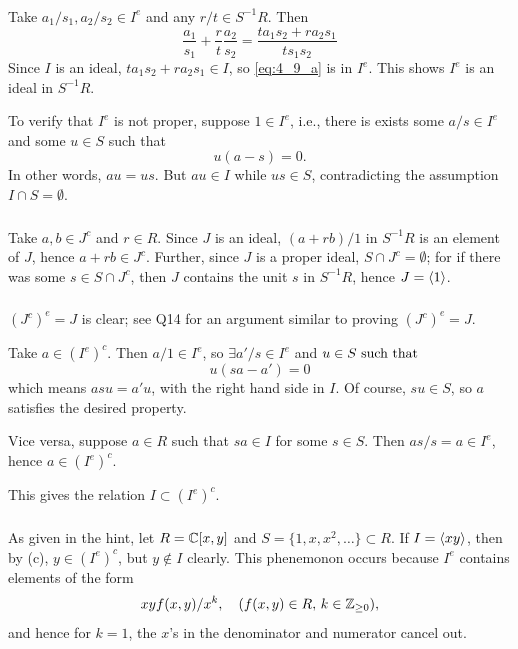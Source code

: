 \documentclass[12pt]{article}
\begin{document}
\subsubsection{} 
Take $a_1 / s_1, a_2 / s_2 \in I^{e}$ and any $r / t \in S^{-1} R$. 
Then 
\begin{equation} \label{eq:4_9_a} 
  \frac{a_1}{s_1} + \frac{r}{t} \frac{a_2}{s_2} = \frac{ta_1 s_2 + ra_2 s_1}{ts_1 s_2}
\end{equation}
Since $I$ is an ideal, $ta_1 s_2 + r a_2 s_1 \in I$, so \eqref{eq:4_9_a} is in $I^{e}$. 
This shows $I^{e}$ is an ideal in $S^{-1}R$. 

To verify that $I^{e}$ is not proper, suppose $1 \in I^{e}$, i.e., 
there is exists some $a / s \in I^{e}$ and some $u \in S$ such that 
$$u(a - s) = 0.$$
In other words, $au = us$. 
But $au \in I$ while $us \in S$, contradicting the assumption $I \cap S = \emptyset$. 

\subsubsection{} 
Take $a, b \in J^{c}$ and $r \in R$. 
Since $J$ is an ideal, $(a + rb) / 1$ in $S^{-1}R$ is an element of $J$, hence $a + rb \in J^{c}$. 
Further, since $J$ is a proper ideal, $S \cap J^{c} = \emptyset$; for if there was some $s \in S \cap J^{c}$, then $J$ contains the unit $s$ in $S^{-1}R$, hence $J = \langle1\rangle$. 

\subsubsection{} 
$(J^{c})^{e} = J$ is clear; 
see Q14 for an argument similar to proving $(J^{c})^{e} = J$. 

Take $a \in (I^{e})^{c}$. 
Then $a/1 \in I^{e}$, so $\exists a' / s \in I^{e}$ and $u \in S \text{ such that }$
$$u(sa - a') = 0$$
which means $asu = a'u$, with the right hand side in $I$. 
Of course, $su \in S$, so $a$ satisfies the desired property. 

Vice versa, suppose $a \in R$ such that $sa \in I$ for some $s \in S$.
Then $as / s = a \in I^{e}$, hence $a \in (I^{e})^{c}$. 

This gives the relation $I \subset (I^{e})^{c}$. 

\subsubsection{} 
As given in the hint, let $R = \mathbb{C}[x, y]$ and $S = \{1, x, x^2, \ldots \} \subset R$. 
If $I = \langle xy\rangle$, then by (c), $y \in (I^{e})^{c}$, but $y \notin I$ clearly. 
This phenemonon occurs because $I^{e}$ contains elements of the form 
$$xy f(x, y) / x^k, \quad (f(x, y) \in R, \, k \in \mathbb{Z}_{\geq 0}),$$
and hence for $k = 1$, the $x$'s in the denominator and numerator cancel out. 
\end{document}
